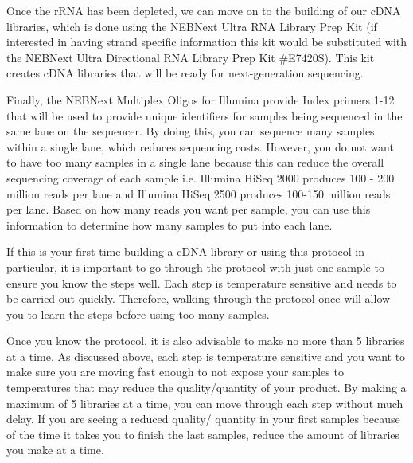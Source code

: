 \documentclass[11pt, oneside]{article}
\begin{document}
	\noindent Once the rRNA has been depleted, we can move on to the building of our cDNA libraries, which is done using the NEBNext Ultra RNA Library 	Prep Kit (if interested in having strand specific information this kit would be substituted with the NEBNext Ultra Directional RNA Library Prep Kit 		\#E7420S). This kit creates cDNA libraries that will be ready for next-generation sequencing. 
	
	\vspace{2mm}
	
	\noindent Finally, the NEBNext Multiplex Oligos for Illumina provide Index primers 1-12 that will be used to provide unique identifiers for samples being 	sequenced in the same lane on the sequencer. By doing this, you can sequence many samples within a single lane, which reduces sequencing costs. 	However, you do not want to have too many samples in a single lane because this can reduce the overall sequencing coverage of each sample i.e. 		Illumina HiSeq 	2000 produces 100 - 200 million reads per lane and Illumina HiSeq 2500 produces 100-150 million reads per lane. Based on how many 	reads you want per sample, you can use this information to determine how many samples to put into each lane. 
	
	\vspace{2mm}
	
	\noindent If this is your first time building a cDNA library or using this protocol in particular, it is important to go through the protocol with just one sample 	to ensure you know the steps well. Each step is temperature sensitive and needs to be carried out quickly. Therefore, walking through the protocol once 	will allow you to learn the steps before using too many samples. 
	
	\vspace{2mm}
	
	\noindent Once you know the protocol, it is also advisable to make no more than 5 libraries at a time. As discussed above, each step is temperature 	sensitive and you want to make sure you are moving fast enough to not expose your samples to temperatures that may reduce the quality/quantity of 	your product. By making a maximum of 5 libraries at a time, you can move through each step without much delay. If you are seeing a reduced quality/	quantity in your first samples because of the time it takes you to finish the last samples, reduce the amount of libraries you make at a time. 
	
	\vspace{3mm}
	
\end{document}
